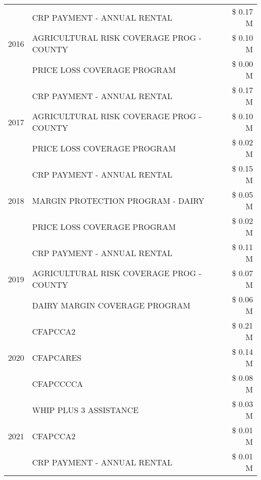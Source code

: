 \begin{tabular}{llr}
\multirow[t]{3}{*}{2016} & CRP PAYMENT - ANNUAL RENTAL & \$ 0.17 M \\
 & AGRICULTURAL RISK COVERAGE PROG - COUNTY & \$ 0.10 M \\
 & PRICE LOSS COVERAGE PROGRAM & \$ 0.00 M \\
\cline{1-3}
\multirow[t]{3}{*}{2017} & CRP PAYMENT - ANNUAL RENTAL & \$ 0.17 M \\
 & AGRICULTURAL RISK COVERAGE PROG - COUNTY & \$ 0.10 M \\
 & PRICE LOSS COVERAGE PROGRAM & \$ 0.02 M \\
\cline{1-3}
\multirow[t]{3}{*}{2018} & CRP PAYMENT - ANNUAL RENTAL & \$ 0.15 M \\
 & MARGIN PROTECTION PROGRAM - DAIRY & \$ 0.05 M \\
 & PRICE LOSS COVERAGE PROGRAM & \$ 0.02 M \\
\cline{1-3}
\multirow[t]{3}{*}{2019} & CRP PAYMENT - ANNUAL RENTAL & \$ 0.11 M \\
 & AGRICULTURAL RISK COVERAGE PROG - COUNTY & \$ 0.07 M \\
 & DAIRY MARGIN COVERAGE PROGRAM & \$ 0.06 M \\
\cline{1-3}
\multirow[t]{3}{*}{2020} & CFAPCCA2 & \$ 0.21 M \\
 & CFAPCARES & \$ 0.14 M \\
 & CFAPCCCCA & \$ 0.08 M \\
\cline{1-3}
\multirow[t]{3}{*}{2021} & WHIP PLUS 3 ASSISTANCE & \$ 0.03 M \\
 & CFAPCCA2 & \$ 0.01 M \\
 & CRP PAYMENT - ANNUAL RENTAL & \$ 0.01 M \\
\cline{1-3}
\bottomrule
\end{tabular}
